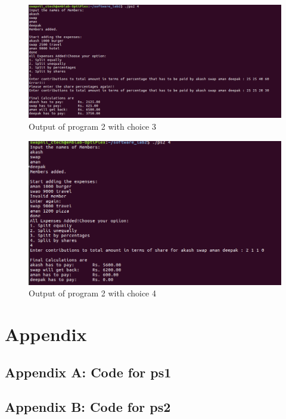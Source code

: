 \documentclass[12pt,a4paper]{article}
\begin{document}
            \begin{figure}[H]
                \centering
                \includegraphics[width=\linewidth]{ps2_3.png}
                \caption{Output of program 2 with choice 3}
                \label{fig:my_label3}
            \end{figure}
            \begin{figure}[H]
                \centering
                \includegraphics[width=\linewidth]{ps2_4.png}
                \caption{Output of program 2 with choice 4}
                \label{fig:my_label4}
            \end{figure}



    \newpage
    \section{Appendix}
        \subsection{Appendix A: Code for ps1}
            
        \subsection{Appendix B: Code for ps2}
            
    \newpage
    \nocite{*} %
    
    
\end{document}
